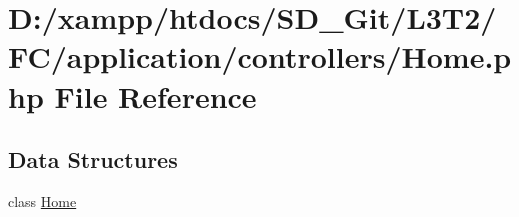 \hypertarget{controllers_2_home_8php}{}\section{D\+:/xampp/htdocs/\+S\+D\+\_\+\+Git/\+L3\+T2/\+F\+C/application/controllers/\+Home.php File Reference}
\label{controllers_2_home_8php}
\subsection*{Data Structures}
\begin{DoxyCompactItemize}
\item 
class \hyperlink{class_home}{Home}
\end{DoxyCompactItemize}
